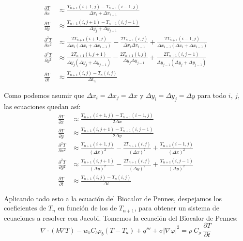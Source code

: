 \documentclass[a4paper]{article}
\begin{document}
\begin{equation*}
\begin{split}
\frac{\partial T}{\partial x} & \approx \frac{T_{n+1}(i+1,j) - T_{n+1}(i-1,j)}{\Delta x_i + \Delta x_{i+1}} \\
\frac{\partial T}{\partial y} & \approx \frac{T_{n+1}(i,j+1) - T_{n+1}(i,j-1)}{\Delta y_j + \Delta y_{j+1}} \\
\frac{\partial^2 T}{\partial x^2} & \approx \frac{2 T_{n+1}(i+1,j)}{\Delta x_i (\Delta x_i + \Delta x_{i-1})} - \frac{2 T_{n+1}(i,j)}{\Delta x_i \Delta x_{i-1}} + \frac{2 T_{n+1}(i-1,j)}{\Delta x_{i-1} (\Delta x_i + \Delta x_{i-1})} \\
\frac{\partial^2 T}{\partial y^2} & \approx \frac{2 T_{n+1}(i,j+1)}{\Delta y_j (\Delta y_j + \Delta y_{j-1})} - \frac{2 T_{n+1}(i,j)}{\Delta y_j \Delta y_{j-1}} + \frac{2 T_{n+1}(i,j-1)}{\Delta y_{j-1} (\Delta y_j + \Delta y_{j-1})} \\
\frac{\partial T}{\partial t} & \approx \frac{T_{n+1}(i,j) - T_n(i,j)}{\Delta t_n}
\end{split}
\end{equation*}

Como podemos asumir que $\Delta x_i = \Delta x_j = \Delta x$ y $\Delta y_i = \Delta y_j = \Delta y$ para todo $i$, $j$, las ecuaciones quedan así:
\begin{equation} \label{eq:derivadas}
\begin{split}
\frac{\partial T}{\partial x} & \approx \frac{T_{n+1}(i+1,j) - T_{n+1}(i-1,j)}{2\Delta x}  \\
\frac{\partial T}{\partial y} & \approx \frac{T_{n+1}(i,j+1) - T_{n+1}(i,j-1)}{2\Delta y} \\
\frac{\partial^2 T}{\partial x^2} & \approx \frac{T_{n+1}(i+1,j)}{(\Delta x)^2} - \frac{2 T_{n+1}(i,j)}{(\Delta x)^2} + \frac{T_{n+1}(i-1,j)}{(\Delta x)^2} \\
\frac{\partial^2 T}{\partial y^2} & \approx \frac{T_{n+1}(i,j+1)}{(\Delta y)^2} - \frac{2 T_{n+1}(i,j)}{(\Delta y)^2} + \frac{T_{n+1}(i,j-1)}{(\Delta y)^2} \\
\frac{\partial T}{\partial t} & \approx \frac{T_{n+1}(i,j) - T_n(i,j)}{\Delta t}
\end{split}
\end{equation}

Aplicando todo esto a la ecuación del Biocalor de Pennes, despejamos los coeficientes de $T_n$ en función de los de $T_{n+1}$, para obtener un sistema de ecuaciones a resolver con Jacobi. Tomemos la ecuación del Biocalor de Pennes:
$$\nabla \cdot (k \nabla T) - w_b C_b \rho_b (T-T_a) + q''' + \sigma |\nabla \varphi|^2 = \rho \ C_\rho \ \frac{\partial T}{\partial t}$$
\end{document}
